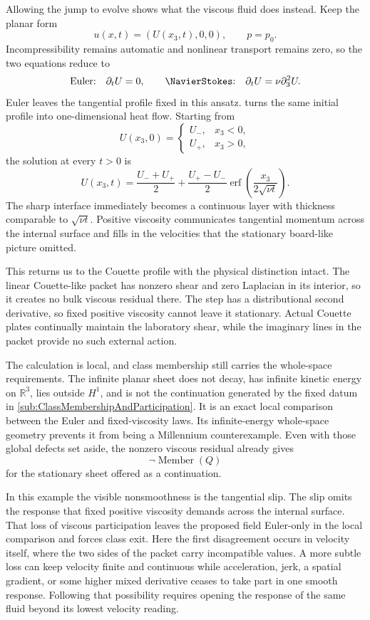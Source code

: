 Allowing the jump to evolve shows what the viscous fluid does instead.
Keep the planar form
\[
  u(x,t)=(U(x_3,t),0,0),
  \qquad
  p=p_0.
\]
Incompressibility remains automatic and nonlinear transport remains zero, so the two equations reduce to
\[
  \text{Euler:}\quad \partial_tU=0,
  \qquad
  \text{\NavierStokes:}\quad \partial_tU=\nu\partial_3^2U.
\]
Euler leaves the tangential profile fixed in this ansatz.
\NavierStokes{} turns the same initial profile into one-dimensional heat flow.
Starting from
\[
  U(x_3,0)
  =
  \begin{cases}
    U_-, & x_3<0,\\
    U_+, & x_3>0,
  \end{cases}
\]
the solution at every \(t>0\) is
\[
  U(x_3,t)
  =
  \frac{U_-+U_+}{2}
  +
  \frac{U_+-U_-}{2}
  \operatorname{erf}\!\left(\frac{x_3}{2\sqrt{\nu t}}\right).
\]
The sharp interface immediately becomes a continuous layer with thickness comparable to \(\sqrt{\nu t}\).
Positive viscosity communicates tangential momentum across the internal surface and fills in the velocities that the stationary board-like picture omitted.

This returns us to the Couette profile with the physical distinction intact.
The linear Couette-like packet has nonzero shear and zero Laplacian in its interior, so it creates no bulk viscous residual there.
The step has a distributional second derivative, so fixed positive viscosity cannot leave it stationary.
Actual Couette plates continually maintain the laboratory shear, while the imaginary lines in the packet provide no such external action.

The calculation is local, and class membership still carries the whole-space requirements.
The infinite planar sheet does not decay, has infinite kinetic energy on \(\mathbb R^3\), lies outside \(H^1\), and is not the continuation generated by the fixed datum in \cref{sub:ClassMembershipAndParticipation}.
It is an exact local comparison between the Euler and fixed-viscosity laws.
Its infinite-energy whole-space geometry prevents it from being a Millennium counterexample.
Even with those global defects set aside, the nonzero viscous residual already gives
\[
  \neg\operatorname{Member}(Q)
\]
for the stationary sheet offered as a \NavierStokes{} continuation.

In this example the visible nonsmoothness is the tangential slip.
The slip omits the response that fixed positive viscosity demands across the internal surface.
That loss of viscous participation leaves the proposed field Euler-only in the local comparison and forces \NavierStokes{} class exit.
Here the first disagreement occurs in velocity itself, where the two sides of the packet carry incompatible values.
A more subtle loss can keep velocity finite and continuous while acceleration, jerk, a spatial gradient, or some higher mixed derivative ceases to take part in one smooth response.
Following that possibility requires opening the response of the same fluid beyond its lowest velocity reading.
